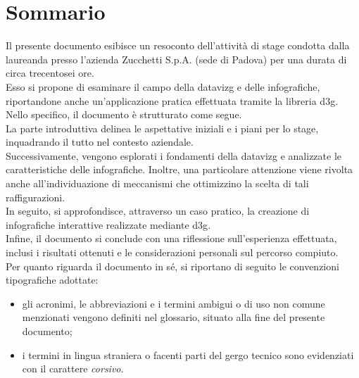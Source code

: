 \cleardoublepage
{}
{}
\begingroup
\let\clearpage\relax
\let\cleardoublepage\relax
\let\cleardoublepage\relax

\chapter*{Sommario}

Il presente documento esibisce un resoconto dell'attività di stage condotta dalla laureanda \myName \space presso 
l'azienda Zucchetti S.p.A. (sede di Padova) per una durata di circa trecentosei ore.\\

\noindent Esso si propone di esaminare il campo della \gls{datavizg} e delle infografiche, riportandone 
anche un'applicazione pratica effettuata tramite la libreria \gls{d3g}. 
\\

\noindent Nello specifico, il documento è strutturato come segue. \\
La parte introduttiva delinea le aspettative iniziali e i piani per lo stage, 
inquadrando il tutto nel contesto aziendale. \\
Successivamente, vengono esplorati i fondamenti della \gls{datavizg} e analizzate le caratteristiche 
delle infografiche. Inoltre, una particolare attenzione viene rivolta anche all'individuazione di meccanismi 
che ottimizzino la scelta di tali raffigurazioni.\\
In seguito, si approfondisce, attraverso un caso pratico, la creazione di infografiche interattive 
realizzate mediante \gls{d3g}.\\
Infine, il documento si conclude con una riflessione sull'esperienza effettuata, inclusi i risultati ottenuti 
e le considerazioni personali sul percorso compiuto.\\

\noindent Per quanto riguarda il documento in sé, si riportano di seguito le convenzioni tipografiche adottate:
\begin{itemize}
    \item gli acronimi, le abbreviazioni e i termini ambigui o di uso non comune menzionati vengono definiti nel glossario, situato alla fine del presente documento;
    \item i termini in lingua straniera o facenti parti del gergo tecnico sono evidenziati con il carattere \emph{corsivo}.
\end{itemize}





\endgroup

\vfill
